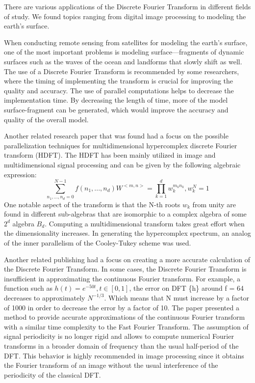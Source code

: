 \documentclass[journal]{IEEEtran}
\begin{document}
	\par{
		There are various applications of the Discrete Fourier Transform in different fields of study. We found topics ranging from digital 
		image processing to modeling the earth's surface.
	}
	\par{
		When conducting remote sensing from satellites for modeling the earth's surface, one of the most important problems is 
		modeling surface—fragments of dynamic surfaces such as the waves of the ocean and landforms that slowly shift as well. 
		The use of a Discrete Fourier Transform is recommended by some researchers, where the timing of implementing the transform 
		is crucial for improving the quality and accuracy. The use of parallel computations helps to decrease the implementation time. 
		By decreasing the length of time, more of the model surface-fragment can be generated, which would improve the accuracy and 
		quality of the overall model.
	}
	\cite{book:GIS}
	\par{
		Another related research paper that was found had a focus on the possible parallelization techniques for multidimensional 
		hypercomplex discrete Fourier transform (HDFT). The HDFT has been mainly utilized in image and multidimensional signal 
		processing and can be given by the following algebraic expression:
		\[ \sum_{n_1,...,n_d=0}^{N-1} f(n_1,...,n_d)W^{<m,n>} = \prod_{k=1}^{d} w_k^{m_kn_k}, w_k^{N} = 1\]
		One notable aspect of the transform is that the N-th roots $w_{k}$ from unity are found in different sub-algebras that are 
		isomorphic to a complex algebra of some $2^{d}$ algebra $B_{d}$. Computing a multidimensional transform takes great effort 
		when the dimensionality increases. In generating the hypercomplex spectrum, an analog of the inner parallelism of the 
		Cooley-Tukey scheme was used.
	}
	\cite{Chicheva}
	\par{
		Another related publishing had a focus on creating a more accurate calculation of the Discrete Fourier Transform. 
		In some cases, the Discrete Fourier Transform is insufficient in approximating the continuous Fourier transform. 
		For example, a function such as $h (t) = e^{-50t}, t\in [0,1]$, the error on DFT \{h\} around f = 64 decreases 
		to approximately $N^{-1/3}$. Which means that N must increase by a factor of 1000 in order to decrease the error 
		by a factor of 10. The paper presented a method to provide accurate approximations of the continuous Fourier 
		transform with a similar time complexity to the Fast Fourier Transform. The assumption of signal periodicity 
		is no longer rigid and allows to compute numerical Fourier transforms in a broader domain of frequency than the 
		usual half-period of the DFT. This behavior is highly recommended in image processing since it obtains the Fourier 
		transform of an image without the usual interference of the periodicity of the classical DFT.
	}
\end{document}
